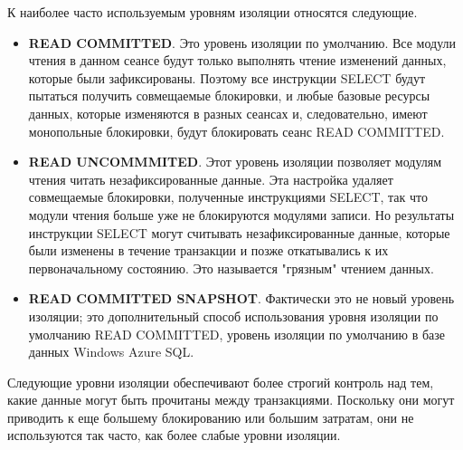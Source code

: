 К наиболее часто используемым уровням изоляции относятся следующие. 

\begin{itemize}
	\item \textbf{READ COMMITTED}. Это уровень изоляции по умолчанию. Все модули чтения в данном сеансе будут только выполнять чтение изменений данных, которые были
	зафиксированы. Поэтому все инструкции SELECT будут пытаться получить совмещаемые блокировки, и любые базовые ресурсы данных, которые изменяются
	в разных сеансах и, следовательно, имеют монопольные блокировки, будут блокировать сеанс READ COMMITTED. 
	\item \textbf{READ UNCOMMMITED}. Этот уровень изоляции позволяет модулям чтения читать незафиксированные данные. Эта настройка удаляет совмещаемые блокировки, полученные инструкциями SELECT, так что модули чтения больше уже не блокируются модулями записи. Но результаты инструкции SELECT могут считывать незафиксированные данные, которые были изменены в течение транзакции и
	позже откатывались к их первоначальному состоянию. Это называется "грязным" чтением данных. 
	\item \textbf{READ COMMITTED SNAPSHOT}. Фактически это не новый уровень изоляции; это дополнительный способ использования уровня изоляции по умолчанию READ
	COMMITTED, уровень изоляции по умолчанию в базе данных Windows Azure SQL.
\end{itemize}


Следующие уровни изоляции обеспечивают более строгий контроль над тем, какие данные могут быть прочитаны между
транзакциями. Поскольку они могут приводить к еще большему блокированию
или большим затратам, они не используются так часто, как более слабые уровни
изоляции. 


